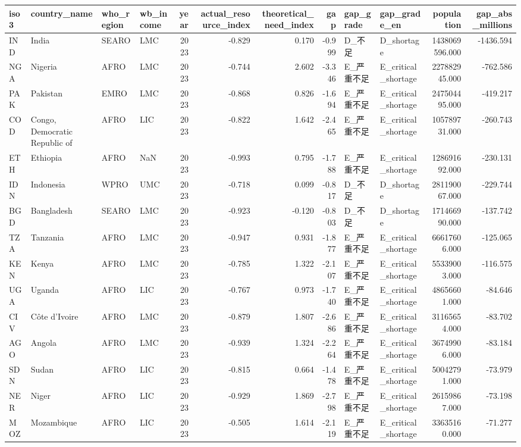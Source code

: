 \begin{tabular}{llllrrrrllrr}
\toprule
iso3 & country_name & who_region & wb_income & year & actual_resource_index & theoretical_need_index & gap & gap_grade & gap_grade_en & population & gap_abs_millions \\
\midrule
IND & India & SEARO & LMC & 2023 & -0.829 & 0.170 & -0.999 & D_不足 & D_shortage & 1438069596.000 & -1436.594 \\
NGA & Nigeria & AFRO & LMC & 2023 & -0.744 & 2.602 & -3.346 & E_严重不足 & E_critical_shortage & 227882945.000 & -762.586 \\
PAK & Pakistan & EMRO & LMC & 2023 & -0.868 & 0.826 & -1.694 & E_严重不足 & E_critical_shortage & 247504495.000 & -419.217 \\
COD & Congo, Democratic Republic of & AFRO & LIC & 2023 & -0.822 & 1.642 & -2.465 & E_严重不足 & E_critical_shortage & 105789731.000 & -260.743 \\
ETH & Ethiopia & AFRO & NaN & 2023 & -0.993 & 0.795 & -1.788 & E_严重不足 & E_critical_shortage & 128691692.000 & -230.131 \\
IDN & Indonesia & WPRO & UMC & 2023 & -0.718 & 0.099 & -0.817 & D_不足 & D_shortage & 281190067.000 & -229.744 \\
BGD & Bangladesh & SEARO & LMC & 2023 & -0.923 & -0.120 & -0.803 & D_不足 & D_shortage & 171466990.000 & -137.742 \\
TZA & Tanzania & AFRO & LMC & 2023 & -0.947 & 0.931 & -1.877 & E_严重不足 & E_critical_shortage & 66617606.000 & -125.065 \\
KEN & Kenya & AFRO & LMC & 2023 & -0.785 & 1.322 & -2.107 & E_严重不足 & E_critical_shortage & 55339003.000 & -116.575 \\
UGA & Uganda & AFRO & LIC & 2023 & -0.767 & 0.973 & -1.740 & E_严重不足 & E_critical_shortage & 48656601.000 & -84.646 \\
CIV & Côte d'Ivoire & AFRO & LMC & 2023 & -0.879 & 1.807 & -2.686 & E_严重不足 & E_critical_shortage & 31165654.000 & -83.702 \\
AGO & Angola & AFRO & LMC & 2023 & -0.939 & 1.324 & -2.264 & E_严重不足 & E_critical_shortage & 36749906.000 & -83.184 \\
SDN & Sudan & AFRO & LIC & 2023 & -0.815 & 0.664 & -1.478 & E_严重不足 & E_critical_shortage & 50042791.000 & -73.979 \\
NER & Niger & AFRO & LIC & 2023 & -0.929 & 1.869 & -2.798 & E_严重不足 & E_critical_shortage & 26159867.000 & -73.198 \\
MOZ & Mozambique & AFRO & LIC & 2023 & -0.505 & 1.614 & -2.119 & E_严重不足 & E_critical_shortage & 33635160.000 & -71.277 \\
\bottomrule
\end{tabular}
